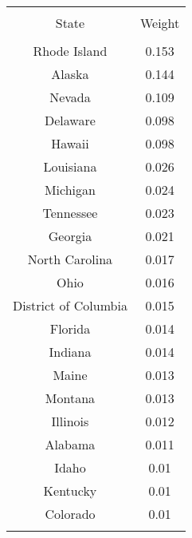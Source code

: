 
\begin{table}[!htbp] \centering 
  \caption{} 
  \label{} 
\begin{tabular}{@{\extracolsep{5pt}} cc} 
\\[-1.8ex]\hline 
\hline \\[-1.8ex] 
State & Weight \\ 
\hline \\[-1.8ex] 
Rhode Island & 0.153 \\ 
Alaska & 0.144 \\ 
Nevada & 0.109 \\ 
Delaware & 0.098 \\ 
Hawaii & 0.098 \\ 
Louisiana & 0.026 \\ 
Michigan & 0.024 \\ 
Tennessee & 0.023 \\ 
Georgia & 0.021 \\ 
North Carolina & 0.017 \\ 
Ohio & 0.016 \\ 
District of Columbia & 0.015 \\ 
Florida & 0.014 \\ 
Indiana & 0.014 \\ 
Maine & 0.013 \\ 
Montana & 0.013 \\ 
Illinois & 0.012 \\ 
Alabama & 0.011 \\ 
Idaho & 0.01 \\ 
Kentucky & 0.01 \\ 
Colorado & 0.01 \\ 
\hline \\[-1.8ex] 
\end{tabular} 
\end{table} 
